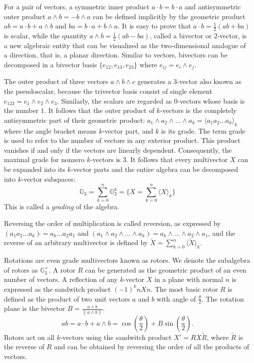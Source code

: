 \documentclass{birkjour}
\numberwithin{equation}{section}
\begin{document}
For a pair of vectors, a symmetric inner product $a \cdot b = b \cdot a$ and antisymmetric outer product $a \wedge b = -b \wedge a$ can be defined implicitly by the geometric product $a b = a \cdot b + a \wedge b$ and $b a = b \cdot a + b \wedge a$. It is easy to prove that $a \cdot b = \frac{1}{2}(a b + b a)$ is scalar, while the quantity $a \wedge b = \frac{1}{2}(a b - b a)$, called a bivector or $2$-vector, is a new algebraic entity that can be visualized as the two-dimensional analogue of a direction, that is, a planar direction. Similar to vectors, bivectors can be decomposed in a bivector basis $\{ e_{12}, e_{13}, e_{23} \}$ where $e_{ij} = e_i \wedge e_j$.

The outer product of three vectors $a \wedge b \wedge c$ generates a $3$-vector also known as the pseudoscalar, because the trivector basis consist of single element $e_{123} = e_1 \wedge e_2 \wedge e_3$. Similarly, the scalars are regarded as $0$-vectors whose basis is the number $1$. It follows that the outer product of $k$-vectors is the completely antisymmetric part of their geometric product: $a_1 \wedge a_2 \wedge ... \wedge a_k = \langle a_1 a_2 ... a_k \rangle_k$ where the angle bracket means $k$-vector part, and $k$ is its grade. The term grade is used to refer to the number of vectors in any exterior product. This product vanishes if and only if the vectors are linearly dependent. Consequently, the maximal grade for nonzero $k$-vectors is $3$. It follows that every multivector $X$ can be expanded into its $k$-vector parts and the entire algebra can be decomposed into $k$-vector subspaces:
\begin{equation*}
\mathbb G_3 = \sum_{k=0}^n{\mathbb{G}^k_3} = \{ X = \sum_{k=0}^n { \langle X \rangle_k } \}
\end{equation*}
This is called a \emph{grading} of the algebra. 

Reversing the order of multiplication is called reversion, as expressed by $(a_1 a_2 ... a_k)\tilde{} = a_k ... a_2 a_1$ and $(a_1 \wedge a_2 \wedge ... \wedge a_k)\tilde{} = a_k \wedge ... \wedge a_2 \wedge a_1$, and the reverse of an arbitrary multivector is defined by $\tilde{X} = \sum_{k=0}^n { \langle \tilde{X} \rangle_k }$.

Rotations are even grade multivectors known as rotors. We denote the subalgebra of rotors as $\mathbb{G}^{+}_3$. A rotor $R$ can be generated as the geometric product of an even number of vectors. A reflection of any $k$-vector $X$ in a plane with normal $n$ is expressed as the sandwitch product $(-1)^k n X n$. The most basic rotor $R$ is defined as the product of two unit vectors $a$ and $b$ with angle of $\frac{\theta}{2}$. The rotation plane is the bivector $B = \frac{a \wedge b}{\| a \wedge b \|}$.
\begin{equation*}
a b = a \cdot b + a \wedge b = \cos\left( \frac{\theta}{2} \right) + B \sin\left( \frac{\theta}{2} \right).
\end{equation*}
Rotors act on all $k$-vectors using the sandwitch product $X' = R X \tilde R$, where $\tilde R$ is the reverse of $R$ and can be obtained by reversing the order of all the products of vectors.
\end{document}
